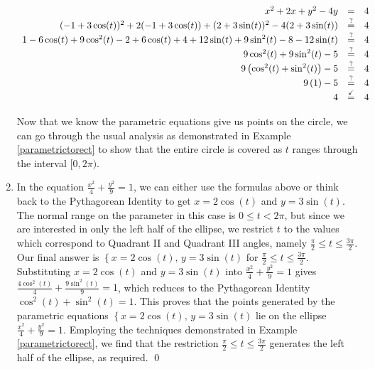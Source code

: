 \begin{ex}
\begin{enumerate}
\[ \begin{array}{rcl}

x^2 + 2x + y^2 - 4y & = & 4  \\
(-1+3\cos(t))^2 + 2(-1+3\cos(t)) + (2+3\sin(t))^2 - 4(2+3\sin(t)) & \stackrel{\text{?}}{=} & 4  \\
1  - 6\cos(t) + 9\cos^{2}(t) - 2 + 6\cos(t) + 4 + 12\sin(t) + 9\sin^{2}(t) - 8 - 12\sin(t) & \stackrel{\text{?}}{=} & 4  \\
9\cos^{2}(t) + 9\sin^{2}(t) -5 & \stackrel{\text{?}}{=} & 4 \\
9\left(\cos^{2}(t) + \sin^{2}(t)\right) -5 & \stackrel{\text{?}}{=} & 4  \\
9\left(1\right) -5 & \stackrel{\text{?}}{=} & 4 \\
4 & \stackrel{\text{\checkmark}}{=} & 4  \\ \end{array} \]

Now that we know the parametric equations give us points on the circle, we can go through the usual analysis as demonstrated in Example \ref{parametrictorect}  to show that the entire circle is covered as $t$ ranges through the interval $[0,2\pi)$.

\item  In the equation $\frac{x^2}{4} + \frac{y^2}{9} = 1$, we can either use the formulas above or think back to the Pythagorean Identity to get  $x = 2\cos(t)$ and $y = 3\sin(t)$.  The normal range on the parameter in this case is $0 \leq t < 2\pi$, but since we are interested in only the left half of the ellipse, we restrict $t$ to the values which correspond to Quadrant II and Quadrant III angles, namely  $\frac{\pi}{2} \leq t \leq \frac{3\pi}{2}$.   Our final answer is $\left\{  x = 2\cos(t), \,   y = 3\sin(t) \right.$ for $\frac{\pi}{2} \leq t \leq \frac{3\pi}{2}$.  Substituting $x = 2\cos(t)$ and $y = 3\sin(t)$ into  $\frac{x^2}{4} + \frac{y^2}{9} = 1$ gives $\frac{4\cos^{2}(t)}{4} + \frac{9 \sin^{2}(t)}{9} = 1$, which reduces to the Pythagorean Identity $\cos^{2}(t) + \sin^{2}(t) = 1$. This proves that the points generated by the parametric equations  $\left\{  x = 2\cos(t), \,   y = 3\sin(t) \right.$ lie on the ellipse $\frac{x^2}{4} + \frac{y^2}{9} = 1$.  Employing the techniques demonstrated in Example \ref{parametrictorect}, we find that the restriction $\frac{\pi}{2} \leq t \leq \frac{3\pi}{2}$ generates the left half of the ellipse, as required.  \qed

\end{enumerate}

\end{ex}

